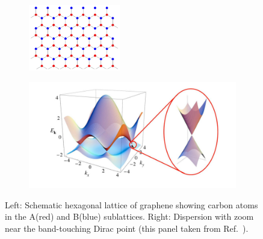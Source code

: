 \begin{figure}[]
	\centering
	\begin{subfigure}[c]{0.3\linewidth}
		\centering
		\includegraphics[width=4cm]{figures/introduction/graphene lattice.png}
	\end{subfigure}%
        \begin{subfigure}[c]{0.7\linewidth}
		\centering
		\includegraphics[width=\linewidth]{figures/introduction/bandstructure_graphene.png}
	\end{subfigure}%
	\caption{Left: Schematic hexagonal lattice of graphene showing carbon atoms in the A(red) and B(blue) sublattices. Right: Dispersion with zoom near the band-touching Dirac point (this panel taken from Ref.~\cite{neto2009electronic}).}
    \label{fig:schematiclatticegraphene}
    \end{figure}
